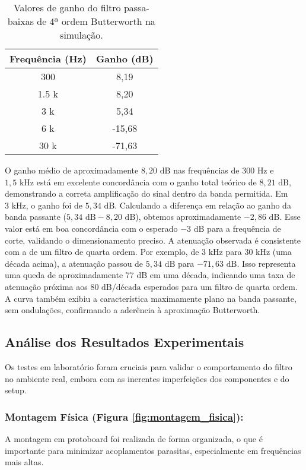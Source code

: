 \begin{table}[H]
\centering
\begin{tabular}{|c|c|}
\hline
\textbf{Frequência (Hz)} & \textbf{Ganho (dB)} \\
\hline
300 & 8,19 \\ \hline
1.5 k & 8,20 \\ \hline
3 k & 5,34 \\ \hline
6 k & -15,68 \\ \hline
30 k & -71,63 \\ \hline
\end{tabular}
\caption{Valores de ganho do filtro passa-baixas de 4ª ordem Butterworth na simulação.}
\label{tab:ganho_simulacao}
\end{table}

O ganho médio de aproximadamente $8,20 \text{ dB}$ nas frequências de $300 \text{ Hz}$ e $1,5 \text{ kHz}$ está em excelente concordância com o ganho total teórico de $8,21 \text{ dB}$, demonstrando a correta amplificação do sinal dentro da banda permitida.
Em $3 \text{ kHz}$, o ganho foi de $5,34 \text{ dB}$. Calculando a diferença em relação ao ganho da banda passante ($5,34 \text{ dB} - 8,20 \text{ dB}$), obtemos aproximadamente $-2,86 \text{ dB}$. Esse valor está em boa concordância com o esperado $-3 \text{ dB}$ para a frequência de corte, validando o dimensionamento preciso.
A atenuação observada é consistente com a de um filtro de quarta ordem. Por exemplo, de $3 \text{ kHz}$ para $30 \text{ kHz}$ (uma década acima), a atenuação passou de $5,34 \text{ dB}$ para $-71,63 \text{ dB}$. Isso representa uma queda de aproximadamente $77 \text{ dB}$ em uma década, indicando uma taxa de atenuação próxima aos $80 \text{ dB/década}$ esperados para um filtro de quarta ordem. A curva também exibiu a característica maximamente plano na banda passante, sem ondulações, confirmando a aderência à aproximação Butterworth.

\subsection{Análise dos Resultados Experimentais}
Os testes em laboratório foram cruciais para validar o comportamento do filtro no ambiente real, embora com as inerentes imperfeições dos componentes e do setup.

\subsubsection{Montagem Física (Figura \ref{fig:montagem_fisica}):} 
A montagem em protoboard foi realizada de forma organizada, o que é importante para minimizar acoplamentos parasitas, especialmente em frequências mais altas.

